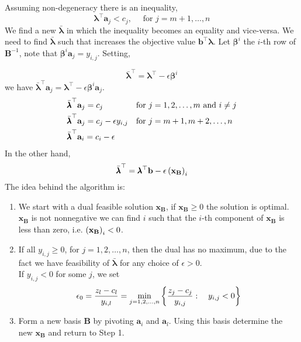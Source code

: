 Assuming non-degeneracy there is an inequality,
\begin{equation}
	\pmb{\lambda}^\top\mathbf{a}_j<c_j, \quad \text{ for } j=m+1,\dots, n
\end{equation}
We find a new $\bar{\pmb{\lambda}}$ in which the inequality becomes an equality and vice-versa. We need to find $\bar{\pmb{\lambda}}$ such that increases the objective value $\mathbf{b}^\top\pmb{\lambda}$.
Let $\pmb{\beta}^{i}$ the $i$-th row of $\mathbf{B}^{-1}$, note that $\pmb{\beta}^{i}\mathbf{a}_j=y_{i,j}$. Setting,

 \begin{equation}
 	\bar{\pmb{\lambda}}^\top=\pmb{\lambda}^\top -\epsilon\pmb{\beta}^i 
 \end{equation}
 we have  $\bar{\pmb{\lambda}}^\top\mathbf{a}_j=\pmb{\lambda}^\top -\epsilon\pmb{\beta}^i\mathbf{a}_j$. 
 \begin{align}
		&\bar{\pmb{\lambda}}^\top \mathbf{a}_j=c_j & &\text{for } j=1,2,\dots, m\ \mathrm{and}\ i\neq j\\
 	&\bar{\pmb{\lambda}}^\top \mathbf{a}_j=c_j-\epsilon y_{i, j}& &\text{for } j=m+1,m+2,\dots, n \\
 	&\bar{\pmb{\lambda}}^\top\mathbf{a}_i=c_i-\epsilon 
 \end{align}
 In the other hand,
 \begin{equation}
 	\bar{\pmb{\lambda}}^\top=\pmb{\lambda}^\top \mathbf{b}-\epsilon\left(  \mathbf{x}_{\mathbf{B}} \right)_i
 \end{equation}
 The idea behind the algorithm is:
\begin{enumerate}
	\item We start with a dual feasible solution $\mathbf{x}_{\mathbf{B}}$, if $\mathbf{x}_{\mathbf{B}}\geq 0$ the solution is optimal. $\mathbf{x}_{\mathbf{B}}$ is not nonnegative we can find $i$ such that the $i$-th component of $\mathbf{x}_{\mathbf{B}}$ is less than zero, i.e. $\left(  \mathbf{x}_{\mathbf{B}} \right)_i<0$.
	\item If all $y_{i,j}\geq 0$, for $j=1,2,\dots,n$, then the dual has no maximum, due to the fact we have feasibility of $\bar{\pmb\lambda}$ for any choice of $\epsilon>0$. 
	\\
	If $y_{i,j}<0$ for some $j$, we set
	\begin{equation*}
		\epsilon_0=\frac{z_l-c_l}{y_{i,l}}=\min_{j=1,2,\dots,n}\left\lbrace \frac{z_j-c_j}{y_{i,j}}:\quad y_{i,j}<0 \right\rbrace
	\end{equation*}
	\item Form a new basis $\mathbf{B}$ by pivoting $\mathbf{a}_i$ and $\mathbf{a}_l$. Using this basis determine the new $\mathbf{x}_{\mathbf{B}}$ and return to Step 1.
\end{enumerate}

